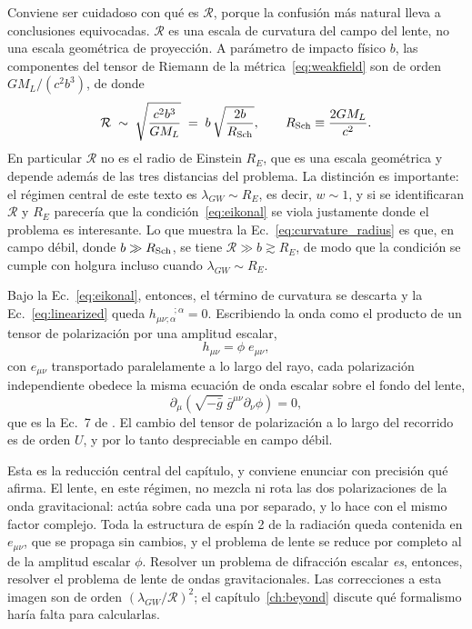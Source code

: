 \documentclass[11pt,a4paper,openany]{book}
\begin{document}
Conviene ser cuidadoso con qu\'e es $\mathcal{R}$, porque la confusi\'on m\'as
natural lleva a conclusiones equivocadas. $\mathcal{R}$ es una escala de
curvatura del campo del lente, no una escala geom\'etrica de proyecci\'on. A
par\'ametro de impacto f\'isico $b$, las componentes del tensor de Riemann de
la m\'etrica~\eqref{eq:weakfield} son de orden $GM_L/(c^{2}b^{3})$, de donde
\begin{equation}
  \mathcal{R}\;\sim\;\sqrt{\frac{c^{2}b^{3}}{GM_L}}
  \;=\;b\,\sqrt{\frac{2b}{R_{\rm Sch}}},
  \qquad R_{\rm Sch}\equiv\frac{2GM_L}{c^{2}} .
  \label{eq:curvature_radius}
\end{equation}
En particular $\mathcal{R}$ no es el radio de Einstein $R_E$, que es una
escala geom\'etrica y depende adem\'as de las tres distancias del problema. La
distinci\'on es importante: el r\'egimen central de este texto es
$\lambda_{GW}\sim R_E$, es decir, $w\sim1$, y si se identificaran
$\mathcal{R}$ y $R_E$ parecer\'ia que la condici\'on~\eqref{eq:eikonal} se
viola justamente donde el problema es interesante. Lo que muestra la
Ec.~\eqref{eq:curvature_radius} es que, en campo d\'ebil, donde
$b\gg R_{\rm Sch}$, se tiene $\mathcal{R}\gg b\gtrsim R_E$, de modo que la
condici\'on se cumple con holgura incluso cuando $\lambda_{GW}\sim R_E$.

Bajo la Ec.~\eqref{eq:eikonal}, entonces, el t\'ermino de curvatura se
descarta y la Ec.~\eqref{eq:linearized} queda
$h_{\mu\nu;\alpha}^{\qquad;\alpha}=0$. Escribiendo la onda como el producto de
un tensor de polarizaci\'on por una amplitud escalar,
\begin{equation}
  h_{\mu\nu}=\phi\;e_{\mu\nu},
  \label{eq:polarization_split}
\end{equation}
con $e_{\mu\nu}$ transportado paralelamente a lo largo del rayo, cada
polarizaci\'on independiente obedece la misma ecuaci\'on de onda escalar sobre
el fondo del lente,
\begin{equation}
  \partial_{\mu}\!\left(\sqrt{-\bar g}\;\bar g^{\mu\nu}\partial_{\nu}\phi\right)=0 ,
  \label{eq:scalar_wave}
\end{equation}
que es la Ec.~7 de \citet{Takahashi2003}. El cambio del tensor de
polarizaci\'on a lo largo del recorrido es de orden $U$, y por lo tanto
despreciable en campo d\'ebil.

Esta es la reducci\'on central del cap\'itulo, y conviene enunciar con
precisi\'on qu\'e afirma. El lente, en este r\'egimen, no mezcla ni rota las
dos polarizaciones de la onda gravitacional: act\'ua sobre cada una por
separado, y lo hace con el mismo factor complejo. Toda la estructura de
esp\'in 2 de la radiaci\'on queda contenida en $e_{\mu\nu}$, que se propaga
sin cambios, y el problema de lente se reduce por completo al de la amplitud
escalar $\phi$. Resolver un problema de difracci\'on escalar \emph{es},
entonces, resolver el problema de lente de ondas gravitacionales. Las
correcciones a esta imagen son de orden $(\lambda_{GW}/\mathcal{R})^{2}$; el
cap\'itulo~\ref{ch:beyond} discute qu\'e formalismo har\'ia falta para
calcularlas.
\end{document}
